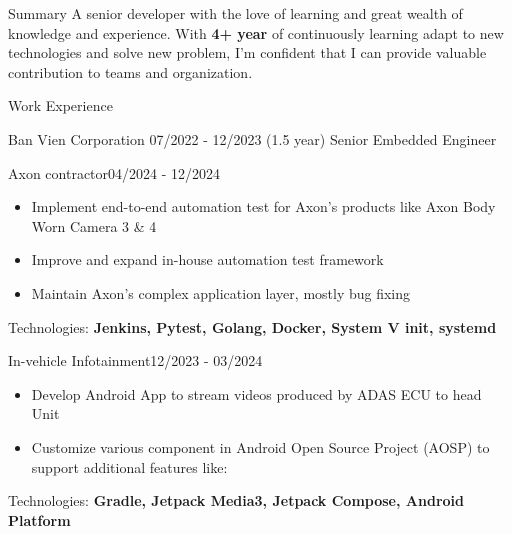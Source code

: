 \documentclass{resume} %
\begin{document}
\begin{rSection}{Summary}
A senior developer with the love of learning and great wealth of knowledge and experience. With \textbf{4+ year} of continuously learning adapt to new technologies and solve new problem, I'm confident that I can provide valuable contribution to teams and organization.
\end{rSection}


\begin{rSection}{Work Experience}
    \begin{rCompanySubsection}
        {Ban Vien Corporation}
        {07/2022 - 12/2023 (1.5 year)}
        {Senior Embedded Engineer}
        {}
         \begin{rProjectSubsubsection}{Axon contractor}{04/2024 - 12/2024}
            \begin{itemize}
                \item Implement end-to-end automation test for Axon's products like Axon Body Worn Camera 3 & 4
                \item Improve and expand in-house automation test framework
                \item Maintain Axon's complex application layer, mostly bug fixing
            \end{itemize}
            \hspace*{2.5em}Technologies: \textbf{Jenkins, Pytest, Golang, Docker, System V init, systemd}
        \end{rProjectSubsubsection}
        \begin{rProjectSubsubsection}{In-vehicle Infotainment}{12/2023 - 03/2024}
            \begin{itemize}
                \item Develop Android App to stream videos produced by ADAS ECU to head Unit
                \item Customize various component in Android Open Source Project (AOSP) to support additional features like:
            \end{itemize}
            \hspace*{2.5em}Technologies: \textbf{Gradle, Jetpack Media3, Jetpack Compose, Android Platform}

\end{rProjectSubsubsection}
\end{rCompanySubsection}
\end{rSection}
\end{document}
